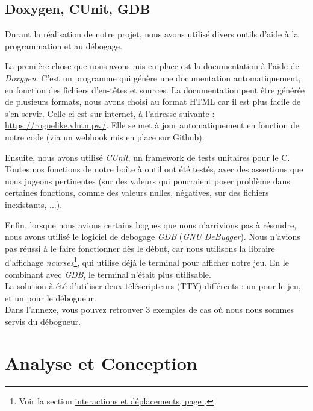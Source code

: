 \documentclass[11pt]{report}
\begin{document}
	\section{Doxygen, CUnit, GDB}
	
		Durant la réalisation de notre projet, nous avons utilisé divers outils d'aide à la programmation et au débogage. 
		
		\vspace{12pt}		
		
		La première chose que nous avons mis en place est la documentation à l'aide de \emph{Doxygen}. C'est un programme qui génère une documentation automatiquement, en fonction des fichiers d'en-têtes et sources. La documentation peut être générée de plusieurs formats, nous avons choisi au format HTML car il est plus facile de s'en servir. Celle-ci est sur internet, à l'adresse suivante : \url{https://roguelike.vlntn.pw/}. Elle se met à jour automatiquement en fonction de notre code (via un webhook mis en place sur Github).
		
		\vspace{12pt}
		
		Ensuite, nous avons utilisé \emph{CUnit}, un framework de tests unitaires pour le C. Toutes nos fonctions de notre boîte à outil ont été testés, avec des assertions que nous jugeons pertinentes (sur des valeurs qui pourraient poser problème dans certaines fonctions, comme des valeurs nulles, négatives, sur des fichiers inexistants, ...).
		
		\vspace{12pt}
		
		Enfin, lorsque nous avions certains bogues que nous n'arrivions pas à résoudre, nous avons utilisé le logiciel de debogage \emph{GDB} (\emph{GNU DeBugger}). Nous n'avions pas réussi à le faire fonctionner dès le début, car nous utilisons la libraire d'affichage \emph{ncurses}\footnote{Voir la section \hyperref[ncurses]{interactions et déplacements, page }.}, qui utilise déjà le terminal pour afficher notre jeu. En le combinant avec \emph{GDB}, le terminal n'était plus utilisable.\\
		La solution à été d'utiliser deux téléscripteurs (\textsc{TTY}) différents : un pour le jeu, et un pour le débogueur.\\
		Dans l'annexe, vous pouvez retrouver 3 exemples de cas où nous nous sommes servis du débogueur.

\chapter{Analyse et Conception}
\end{document}
